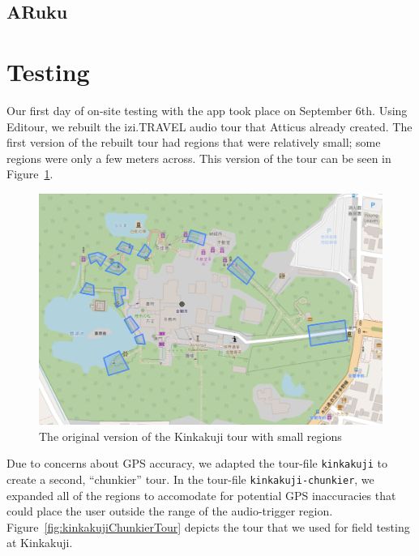 \documentclass[a4paper, 10pt, american, titlepage]{article}
\begin{document}
\subsection{ARuku}
\label{sec:aruku}

\section{Testing}
\label{sec:testing}

Our first day of on-site testing with the app took place on September 6th.
Using Editour, we rebuilt the izi.TRAVEL audio tour that Atticus already
created. The first version of the rebuilt tour had regions that were relatively
small; some regions were only a few meters across. This version of the tour can
be seen in Figure~\ref{fig:kinkakujiTour}.

\begin{figure}[h]
	\centering
	\includegraphics[width=\textwidth]{kinkakuji-tour.png}
	\caption[The original version of the Kinkakuji tour]{The original version of
    the Kinkakuji tour with small regions}
	\label{fig:kinkakujiTour}
\end{figure}

Due to concerns about GPS accuracy, we adapted the tour-file \texttt{kinkakuji} to
create a second, ``chunkier'' tour.  In the tour-file \texttt{kinkakuji-chunkier},
we expanded all of the regions to accomodate for potential GPS inaccuracies
that could place the user outside the range of the audio-trigger region.
Figure~\ref{fig:kinkakujiChunkierTour} depicts the tour that we used for field
testing at Kinkakuji.
\end{document}

